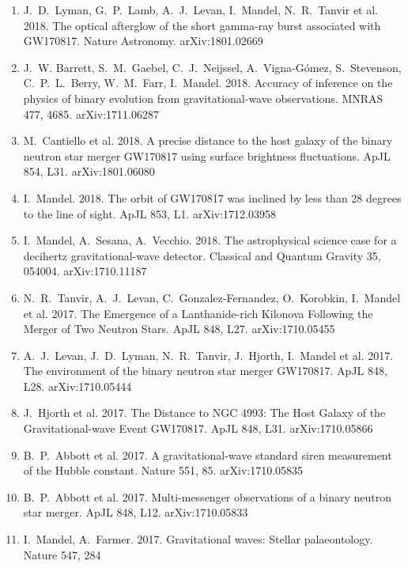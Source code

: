 \documentclass[margin,line]{res}
\begin{document}
\begin{resume}
\begin{enumerate}
\item J.~D.~Lyman, G.~P.~Lamb, A.~J.~Levan, I.~Mandel, N.~R.~Tanvir et al.  2018. The optical afterglow of the short gamma-ray burst associated with GW170817.  Nature Astronomy. arXiv:1801.02669

\item J.~W. Barrett, S.~M.~Gaebel, C.~J.~Neijssel, A.~Vigna-G\'{o}mez, S.~Stevenson, C.~P.~L.~Berry, W.~M.~Farr, I.~Mandel.  2018.  Accuracy of inference on the physics of binary evolution from gravitational-wave observations.   MNRAS 477, 4685.  arXiv:1711.06287

\item M.~Cantiello et al. 2018.  A precise distance to the host galaxy of the binary neutron star merger GW170817 using surface brightness fluctuations.  ApJL 854, L31.  arXiv:1801.06080

\item I.~Mandel.  2018. The orbit of GW170817 was inclined by less than 28 degrees to the line of sight.  ApJL 853, L1. arXiv:1712.03958

\item I.~Mandel, A.~Sesana, A.~Vecchio. 2018.  The astrophysical science case for a decihertz gravitational-wave detector.  Classical and Quantum Gravity 35, 054004. arXiv:1710.11187

\item N.~R.~Tanvir, A.~J.~Levan, C.~Gonzalez-Fernandez, O.~Korobkin, I.~Mandel et al. 2017.  The Emergence of a Lanthanide-rich Kilonova Following the Merger of Two Neutron Stars.  ApJL 848, L27.  arXiv:1710.05455 

\item A.~J.~Levan, J.~D.~Lyman, N.~R.~Tanvir, J.~Hjorth, I.~Mandel et al. 2017. The environment of the binary neutron star merger GW170817.  ApJL 848, L28.  arXiv:1710.05444

\item J.~Hjorth et al. 2017. The Distance to NGC 4993: The Host Galaxy of the Gravitational-wave Event GW170817.  ApJL 848, L31.  arXiv:1710.05866

\item B.~P.~Abbott et al. 2017.   A gravitational-wave standard siren measurement of the Hubble constant.  Nature 551, 85. arXiv:1710.05835

\item B.~P.~Abbott et al. 2017. Multi-messenger observations of a binary neutron star merger. ApJL 848, L12. arXiv:1710.05833

\item I.~Mandel, A.~Farmer.  2017. Gravitational waves: Stellar palaeontology.  Nature 547, 284


\end{enumerate}
\end{resume}
\end{document}

